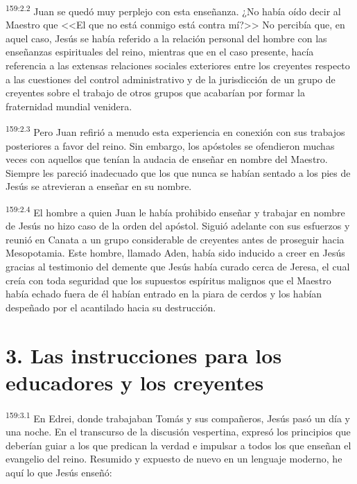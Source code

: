 \par 
\textsuperscript{159:2.2} Juan se quedó muy perplejo con esta enseñanza. ¿No había oído decir al Maestro que <<El que no está conmigo está contra mí?>> No percibía que, en aquel caso, Jesús se había referido a la relación personal del hombre con las enseñanzas espirituales del reino, mientras que en el caso presente, hacía referencia a las extensas relaciones sociales exteriores entre los creyentes respecto a las cuestiones del control administrativo y de la jurisdicción de un grupo de creyentes sobre el trabajo de otros grupos que acabarían por formar la fraternidad mundial venidera.

\par 
\textsuperscript{159:2.3} Pero Juan refirió a menudo esta experiencia en conexión con sus trabajos posteriores a favor del reino. Sin embargo, los apóstoles se ofendieron muchas veces con aquellos que tenían la audacia de enseñar en nombre del Maestro. Siempre les pareció inadecuado que los que nunca se habían sentado a los pies de Jesús se atrevieran a enseñar en su nombre.

\par 
\textsuperscript{159:2.4} El hombre a quien Juan le había prohibido enseñar y trabajar en nombre de Jesús no hizo caso de la orden del apóstol. Siguió adelante con sus esfuerzos y reunió en Canata a un grupo considerable de creyentes antes de proseguir hacia Mesopotamia. Este hombre, llamado Aden, había sido inducido a creer en Jesús gracias al testimonio del demente que Jesús había curado cerca de Jeresa, el cual creía con toda seguridad que los supuestos espíritus malignos que el Maestro había echado fuera de él habían entrado en la piara de cerdos y los habían despeñado por el acantilado hacia su destrucción.

\section*{3. Las instrucciones para los educadores y los creyentes}
\par 
\textsuperscript{159:3.1} En Edrei, donde trabajaban Tomás y sus compañeros, Jesús pasó un día y una noche. En el transcurso de la discusión vespertina, expresó los principios que deberían guiar a los que predican la verdad e impulsar a todos los que enseñan el evangelio del reino. Resumido y expuesto de nuevo en un lenguaje moderno, he aquí lo que Jesús enseñó:

